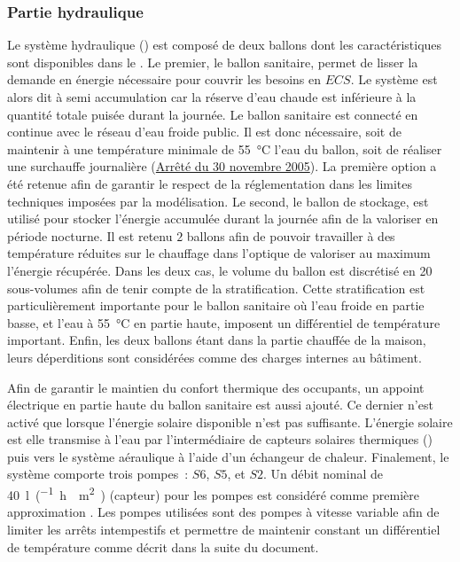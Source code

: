 \subsubsection{Partie hydraulique} %
\label{ssub:partie_hyraulique}
Le système hydraulique () est composé de deux ballons dont les
caractéristiques sont disponibles dans le . Le premier, le ballon
sanitaire, permet de lisser la demande en énergie nécessaire pour couvrir les besoins en
$ECS$. Le système est alors dit à semi accumulation car la réserve d’eau chaude est inférieure
à la quantité totale puisée durant la journée. Le ballon sanitaire est connecté en
continue avec le réseau d’eau froide public. Il est donc nécessaire, soit de maintenir
à une température minimale de \SI{55}{\celsius} l’eau du ballon, soit de réaliser une surchauffe journalière
(\href{https://www.legifrance.gouv.fr/affichTexte.do?cidTexte=JORFTEXT000000423756}{Arrêté
du 30 novembre 2005}). La première option a été retenue afin de garantir le respect de la
réglementation dans les limites techniques imposées par la modélisation. Le second, le
ballon de stockage, est utilisé pour stocker l’énergie accumulée durant la journée afin de
la valoriser en période nocturne. Il est retenu $2$ ballons afin de pouvoir travailler
à des température réduites sur le chauffage dans l’optique de valoriser au maximum
l’énergie récupérée.
Dans les deux cas, le volume du ballon est discrétisé en
\num{20} sous-volumes afin de tenir compte de la stratification. Cette stratification est
particulièrement importante pour le ballon sanitaire où l’eau froide en partie basse, et
l’eau à \SI{55}{\celsius} en partie haute, imposent un différentiel de température
important. Enfin, les deux ballons étant dans la partie chauffée de la maison, leurs
déperditions sont considérées comme des charges internes au bâtiment.

Afin de garantir le maintien du confort thermique des occupants, un appoint électrique en
partie haute du ballon sanitaire est aussi ajouté. Ce dernier n’est activé que lorsque
l’énergie solaire disponible n’est pas suffisante. L’énergie solaire est elle transmise à
l’eau par l’intermédiaire de capteurs solaires thermiques () puis vers le
système aéraulique à l’aide d’un échangeur de chaleur. Finalement, le système comporte trois
pompes~: $S6$, $S5$, et $S2$. Un débit nominal de \SI{40}{\litre\per(\hour\period\meter\squared)}
(capteur) pour les pompes est considéré comme première approximation
\parencite{Peuser2005}. Les pompes utilisées sont des pompes à vitesse variable afin de
limiter les arrêts intempestifs \parencite{Kicsiny20123489} et permettre de maintenir
constant un différentiel de température comme décrit dans la suite du document.



